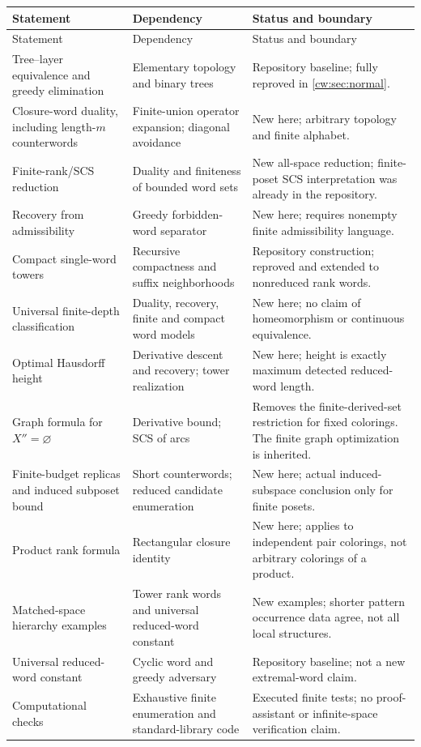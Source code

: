 \documentclass[11pt,letterpaper]{article}
\numberwithin{equation}{section}
\theoremstyle{definition}
\theoremstyle{remark}
\theoremstyle{definition}
\begin{document}
\small
\begin{longtable}{@{}>{\raggedright\arraybackslash}p{}
>{\raggedright\arraybackslash}p{}
>{\raggedright\arraybackslash}p{}@{}}
\toprule
Statement & Dependency & Status and boundary\\
\midrule
\endfirsthead
\toprule
Statement & Dependency & Status and boundary\\
\midrule
\endhead
Tree--layer equivalence and greedy elimination & Elementary topology and binary trees & Repository baseline; fully reproved in \cref{cw:sec:normal}.\\[4pt]
Closure-word duality, including length-$m$ counterwords & Finite-union operator expansion; diagonal avoidance & New here; arbitrary topology and finite alphabet.\\[4pt]
Finite-rank/SCS reduction & Duality and finiteness of bounded word sets & New all-space reduction; finite-poset SCS interpretation was already in the repository.\\[4pt]
Recovery from admissibility & Greedy forbidden-word separator & New here; requires nonempty finite admissibility language.\\[4pt]
Compact single-word towers & Recursive compactness and suffix neighborhoods & Repository construction; reproved and extended to nonreduced rank words.\\[4pt]
Universal finite-depth classification & Duality, recovery, finite and compact word models & New here; no claim of homeomorphism or continuous equivalence.\\[4pt]
Optimal Hausdorff height & Derivative descent and recovery; tower realization & New here; height is exactly maximum detected reduced-word length.\\[4pt]
Graph formula for $X''=\varnothing$ & Derivative bound; SCS of arcs & Removes the finite-derived-set restriction for fixed colorings. The finite graph optimization is inherited.\\[4pt]
Finite-budget replicas and induced subposet bound & Short counterwords; reduced candidate enumeration & New here; actual induced-subspace conclusion only for finite posets.\\[4pt]
Product rank formula & Rectangular closure identity & New here; applies to independent pair colorings, not arbitrary colorings of a product.\\[4pt]
Matched-space hierarchy examples & Tower rank words and universal reduced-word constant & New examples; shorter pattern occurrence data agree, not all local structures.\\[4pt]
Universal reduced-word constant & Cyclic word and greedy adversary & Repository baseline; not a new extremal-word claim.\\[4pt]
Computational checks & Exhaustive finite enumeration and standard-library code & Executed finite tests; no proof-assistant or infinite-space verification claim.\\
\bottomrule
\end{longtable}
\normalsize
\end{document}
